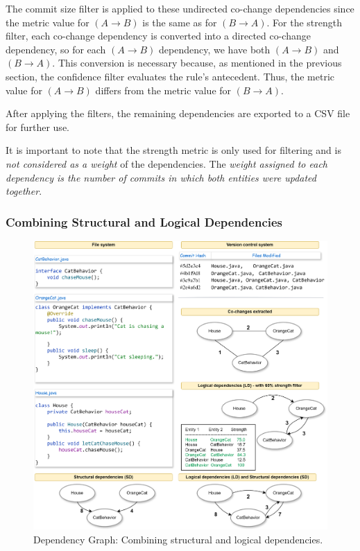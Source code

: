 \documentclass[12pt, a4paper, twoside]{report}
\begin{document}
The commit size filter is applied to these undirected co-change dependencies since the metric value for $(A \rightarrow B)$ is the same as for $(B \rightarrow A)$. For the strength filter, each co-change dependency is converted into a directed co-change dependency, so for each $(A \rightarrow B)$ dependency, we have both $(A \rightarrow B)$ and $(B \rightarrow A)$. This conversion is necessary because, as mentioned in the previous section, the confidence filter evaluates the rule's antecedent. Thus, the metric value for $(A \rightarrow B)$ differs from the metric value for $(B \rightarrow A)$.

After applying the filters, the remaining dependencies are exported to a CSV file for further use.

It is important to note that the strength metric is only used for filtering and is \textit{not considered as a weight} of the dependencies. The \textit{weight assigned to each dependency is the number of commits in which both entities were updated together}.


\subsubsection{Combining Structural and Logical Dependencies}


\begin{figure}[t!]
  \centering
  \includegraphics[width=\columnwidth]{codegraph.png}
  \caption{Dependency Graph: Combining structural and logical dependencies.}
  \label{fig:codegraph}
\end{figure}
\end{document}
